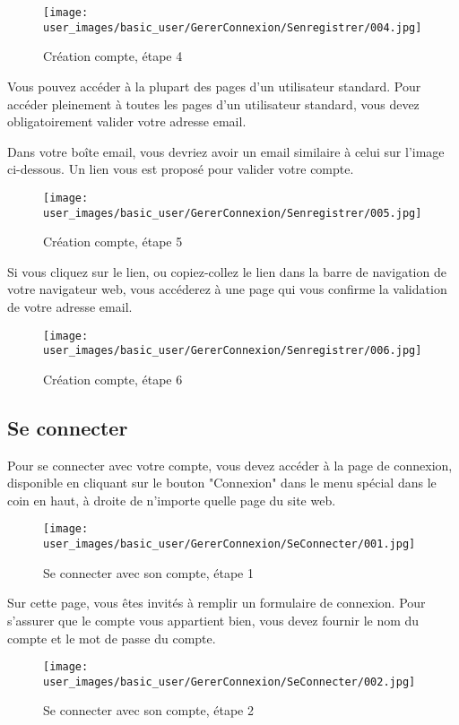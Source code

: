\begin{figure}[H]
\centering
\texttt{[image: user\_images/basic\_user/GererConnexion/Senregistrer/004.jpg]}
\caption{Création compte, étape 4}
\end{figure}

Vous pouvez accéder à la plupart des pages d'un utilisateur standard. Pour accéder pleinement à toutes les pages d'un utilisateur standard, vous devez obligatoirement valider votre adresse email. \newline

Dans votre boîte email, vous devriez avoir un email similaire à celui sur l'image ci-dessous. Un lien vous est proposé pour valider votre compte.

\begin{figure}[H]
\centering
\texttt{[image: user\_images/basic\_user/GererConnexion/Senregistrer/005.jpg]}
\caption{Création compte, étape 5}
\end{figure}

Si vous cliquez sur le lien, ou copiez-collez le lien dans la barre de navigation de votre navigateur web, vous accéderez à une page qui vous confirme la validation de votre adresse email.

\begin{figure}[H]
\centering
\texttt{[image: user\_images/basic\_user/GererConnexion/Senregistrer/006.jpg]}
\caption{Création compte, étape 6}
\end{figure}

\subsection{Se connecter}

Pour se connecter avec votre compte, vous devez accéder à la page de connexion, disponible en cliquant sur le bouton "Connexion" dans le menu spécial dans le coin en haut, à droite de n'importe quelle page du site web.

\begin{figure}[H]
\centering
\texttt{[image: user\_images/basic\_user/GererConnexion/SeConnecter/001.jpg]}
\caption{Se connecter avec son compte, étape 1}
\end{figure}

Sur cette page, vous êtes invités à remplir un formulaire de connexion. Pour s'assurer que le compte vous appartient bien, vous devez fournir le nom du compte et le mot de passe du compte.

\begin{figure}[H]
\centering
\texttt{[image: user\_images/basic\_user/GererConnexion/SeConnecter/002.jpg]}
\caption{Se connecter avec son compte, étape 2}
\end{figure}

